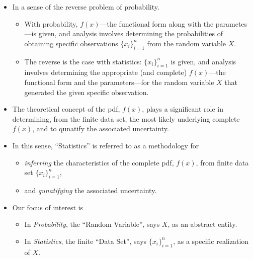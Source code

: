 \documentclass[twoside]{article}
\theoremstyle{definition}
\theoremstyle{remark}
\theoremstyle{remark}
\begin{document}
\begin{itemize}
  \item In a sense of the reverse problem of probability.
  \begin{itemize}
    \item With probability, $f(x)$---the functional form along with the parametes
    ---is given, and analysis involves determining the probabilities of obtaining
    specific observations ${\{ x_i \}}_{i=1}^{n}$ from the random variable $X$.
    \item The reverse is the case with statistics: ${\{ x_i \}}_{i=1}^{n}$ is
    given, and analysis involves determining the appropriate (and complete)
    $f(x)$---the functional form and the parameters---for the random variable
    $X$ that generated the given specific observation.
  \end{itemize}

  \item The theoretical concept of the pdf, $f(x)$, plays a significant role
  in determining, from the finite data set, the most likely underlying complete
  $f(x)$, and to qunatify the associated uncertainty.

  \item In this sense, ``Statistics'' is referred to as a methodology for
  \begin{itemize}
    \item \textit{inferring} the characteristics of the complete pdf, $f(x)$, from
    finite data set ${\{ x_i \}}_{i=1}^{n}$,
    \item and \textit{qunatifying} the associated uncertainty.
  \end{itemize}

  \item Our focus of interest is
  \begin{itemize}
    \item In \textit{Probability}, the ``Random Variable'', says $X$,
    as an abstract entity.
    \item In \textit{Statistics}, the finite ``Data Set'', says ${\{ x_i \}}_{i=1}^{n}$,
    as a specific realization of $X$.
  \end{itemize}
\end{itemize}
\end{document}
